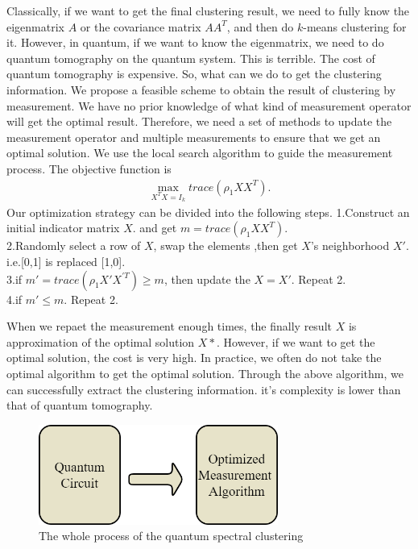\documentclass[twocolumn,notitlepage]{revtex4-1}
\begin{document}
Classically, if we want to get the final clustering result, we need to fully know the eigenmatrix $A$ or the covariance matrix $AA^T$, and then do $k$-means clustering for it. However, in quantum, if we want to know the eigenmatrix, we need to do quantum tomography on the quantum system. This is terrible. The cost of quantum tomography is expensive. So, what can we do to get the clustering information. We propose a feasible scheme to obtain the result of clustering by measurement. We have no prior knowledge of what kind of measurement operator will get the optimal result. Therefore, we need a set of methods to update the measurement operator and multiple measurements to ensure that we get an optimal solution. We use the local search algorithm to guide the measurement process. 
The objective function is 
\begin{align}
    \max_{X^TX=I_{k}} trace(\rho_{1} XX^T).
\end{align}
Our optimization strategy can be divided into the following steps.
1.Construct an initial indicator matrix $X$. and get $m=trace(\rho_{1} XX^T)$.\\
2.Randomly select a row of $X$, swap the elements ,then get $X$'s neighborhood $X'$. i.e.[0,1] is replaced [1,0].\\
3.if $m'=trace(\rho_{1} X'X^{'T}) \geq m$, then update the $X=X'$. Repeat 2.\\
4.if $m'\leq m$. Repeat 2.

When we repaet the measurement enough times, the finally result $X$ is approximation of the optimal solution $X*$. However, if we want to get the optimal solution, the cost is very high. In practice, we often do not take the optimal algorithm to get the optimal solution. Through the above algorithm, we can successfully extract the clustering information. it's complexity is lower than that of quantum tomography.

\begin{figure}[H] %
    \centering %
    \includegraphics[width=0.7\textwidth]{image//algorithm.png} %
    \caption{The whole process of the quantum spectral clustering} %
    \label{Fig.main2} %
\end{figure}
\end{document}

